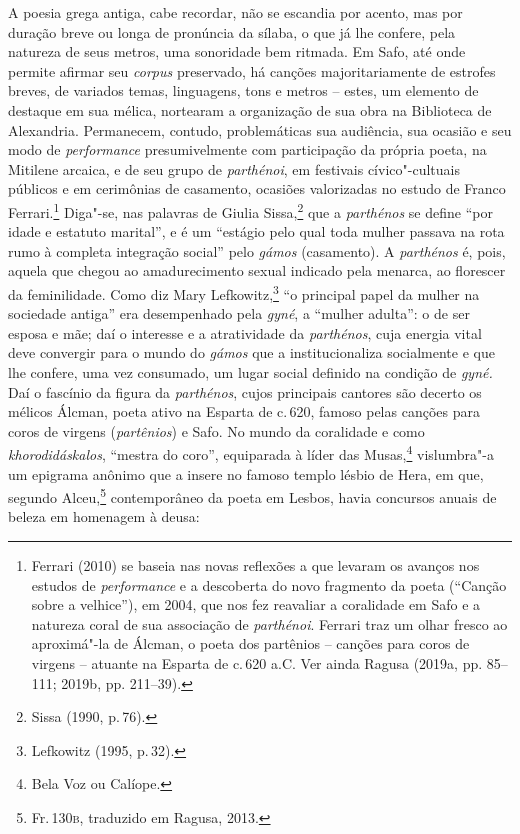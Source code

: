  A poesia grega antiga, cabe recordar, não se
escandia por acento, mas por duração breve ou longa de pronúncia da sílaba, o
que já lhe confere, pela natureza de seus metros, uma sonoridade bem ritmada. Em Safo, até onde permite afirmar seu \textit{corpus} preservado,
há canções majoritariamente de estrofes breves, de variados temas,
linguagens, tons e metros -- estes, um elemento de destaque em sua mélica, nortearam a organização de sua obra na Biblioteca de Alexandria.
Permanecem, contudo, problemáticas
sua audiência, sua ocasião e seu modo de \textit{performance} presumivelmente com participação da própria poeta, na Mitilene arcaica, e de seu grupo de \textit{parthénoi}, em festivais cívico"-cultuais públicos e em cerimônias de casamento, ocasiões valorizadas no estudo de Franco Ferrari.\footnote{Ferrari (2010) se baseia nas novas reflexões a que levaram os avanços nos estudos de \textit{performance} e a descoberta do novo fragmento da poeta (``Canção sobre a velhice''), em 2004, que nos fez reavaliar a coralidade em Safo e a natureza coral de sua associação de \textit{parthénoi}. Ferrari traz um olhar fresco ao aproximá"-la de Álcman, o poeta dos partênios -- canções para coros de virgens -- atuante na Esparta de c.\,620 a.C. Ver ainda Ragusa (2019a, pp. 85--111; 2019b, pp. 211--39).}
Diga"-se, nas palavras de Giulia Sissa,\footnote{Sissa (1990, p.\,76).} que a \textit{parthénos} se define “por idade e estatuto marital”, e é um “estágio pelo qual toda mulher passava na rota rumo à completa integração social” pelo \textit{gámos} (casamento). A \textit{parthénos} é, pois, aquela que chegou ao amadurecimento sexual indicado pela menarca, ao florescer da feminilidade. Como diz Mary Lefkowitz,\footnote{Lefkowitz (1995, p.\,32).} “o principal papel da mulher na sociedade antiga” era desempenhado pela \textit{gyné}, a ``mulher adulta'': o de ser esposa e mãe; daí o interesse e a atratividade da \textit{parthénos}, cuja energia vital deve convergir para o mundo do \textit{gámos} que a institucionaliza socialmente e que lhe confere, uma vez consumado, um lugar social definido na condição de \textit{gyné.} Daí o fascínio da figura da \textit{parthénos}, cujos principais cantores são decerto os mélicos Álcman, poeta ativo na Esparta de c.\,620, famoso pelas canções para coros de virgens (\textit{partênios}) e Safo.
No mundo da coralidade e como \textit{khorodidáskalos}, ``mestra do coro'', equiparada à líder das Musas,\footnote{Bela Voz ou Calíope.} vislumbra"-a um epigrama anônimo que a insere no famoso templo lésbio de Hera, em que, segundo Alceu,\footnote{Fr.\,130\textsc{b}, traduzido em Ragusa, 2013.} contemporâneo da poeta em Lesbos, havia concursos anuais de beleza em homenagem à deusa:


